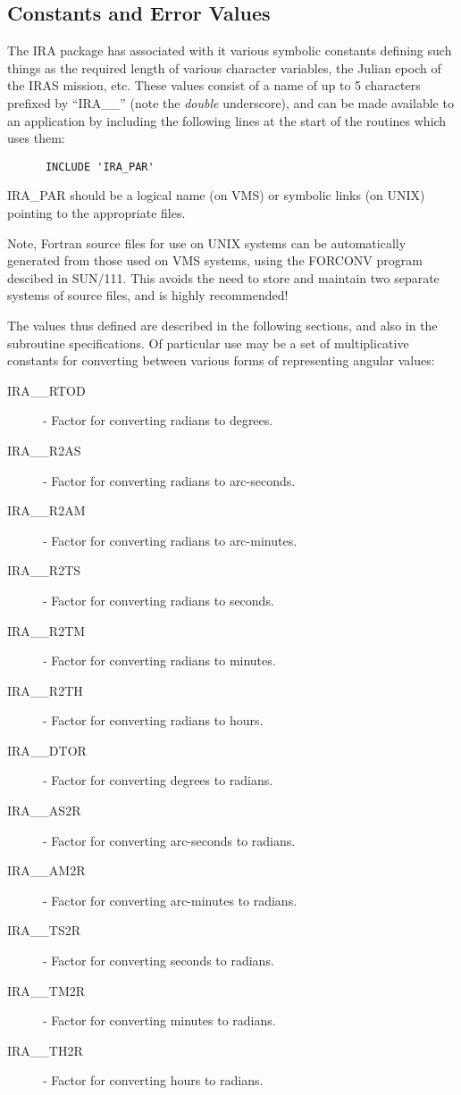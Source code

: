 \subsection {Constants and Error Values}
\label {SEC:CON}
The IRA package has associated with it various symbolic constants defining such
things as the required length of various character variables, the Julian epoch
of the IRAS mission, etc. These values consist of a name of up to 5 characters
prefixed by ``IRA\_\_''  (note the {\em double} underscore), and can be made
available to an application by including the following lines at the start of the
routines which uses them:

\begin{verbatim}
      INCLUDE 'IRA_PAR'
\end{verbatim}


IRA\_PAR should be a logical name (on VMS) or symbolic links (on UNIX) pointing
to the appropriate files.

Note, Fortran source files for use on UNIX systems can be automatically
generated from those used on VMS systems, using the FORCONV program descibed
in SUN/111. This avoids the need to store and maintain two separate systems of
source files, and is highly recommended!

The values thus defined are described in the following sections, and also in the
subroutine specifications. Of particular use may be a set of multiplicative
constants for converting between various forms of representing angular values:

\begin{description}
\item [IRA\_\_RTOD] - Factor for converting radians to degrees.
\item [IRA\_\_R2AS] - Factor for converting radians to arc-seconds.
\item [IRA\_\_R2AM] - Factor for converting radians to arc-minutes.
\item [IRA\_\_R2TS] - Factor for converting radians to seconds.
\item [IRA\_\_R2TM] - Factor for converting radians to minutes.
\item [IRA\_\_R2TH] - Factor for converting radians to hours.
\item [IRA\_\_DTOR] - Factor for converting degrees to radians.
\item [IRA\_\_AS2R] - Factor for converting arc-seconds to radians.
\item [IRA\_\_AM2R] - Factor for converting arc-minutes to radians.
\item [IRA\_\_TS2R] - Factor for converting seconds to radians.
\item [IRA\_\_TM2R] - Factor for converting minutes to radians.
\item [IRA\_\_TH2R] - Factor for converting hours to radians.

\end{description}


